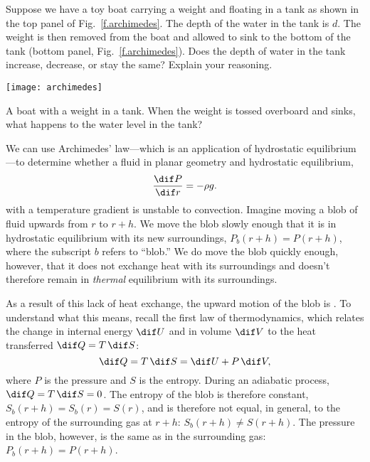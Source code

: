 \begin{exercisebox}
Suppose we have a toy boat carrying a weight and floating in a tank as shown in the top panel of Fig.~\ref{f.archimedes}. The depth of the water in the tank is $d$. The weight is then removed from the boat and allowed to sink to the bottom of the tank (bottom panel, Fig.~\ref{f.archimedes}). Does the depth of water in the tank increase, decrease, or stay the same? Explain your reasoning.
\end{exercisebox}
\begin{marginfigure}
\texttt{[image: archimedes]}
\caption[A boat with a weight]{\label{f.archimedes} A boat with a weight in a tank. When the weight is tossed overboard and sinks, what happens to the water level in the tank?}
\end{marginfigure}

We can use Archimedes' law---which is an application of hydrostatic equilibrium---to determine whether a fluid in planar geometry and hydrostatic equilibrium,
\begin{equation}
\frac{\dif P}{\dif r} = -\rho g.
\end{equation}
with a temperature gradient is unstable to convection. Imagine moving a blob of fluid upwards from $r$ to $r+h$.  We move the blob slowly enough that it is in hydrostatic equilibrium with its new surroundings, $P_{b}(r+h) = P(r+h)$, where the subscript $b$ refers to ``blob.'' We do move the blob quickly enough, however, that it does not exchange heat with its surroundings and doesn't therefore remain in \emph{thermal} equilibrium with its surroundings. 

As a result of this lack of heat exchange, the upward motion of the blob is .  To understand what this means, recall the first law of thermodynamics\cite{Fermi1956Thermodynamics}, which relates the change in internal energy $\dif U$ and in volume $\dif V$ to the heat transferred $\dif Q = T\,\dif S$:
\begin{equation}\label{e.first-law-thermo}
	\dif Q = T\,\dif S = \dif U + P\,\dif V,
\end{equation}
where $P$ is the pressure and $S$ is the entropy. During an adiabatic process, $\dif Q = T\,\dif S = 0$. The entropy of the blob is therefore constant, 
$S_{b}(r+h) = S_{b}(r) = S(r)$, and is therefore not equal, in general, to the entropy of the surrounding gas at $r+h$: $S_{b}(r+h)  \neq S(r+h)$. The pressure in the blob, however, is the same as in the surrounding gas: $P_{b}(r+h) = P(r+h)$.

